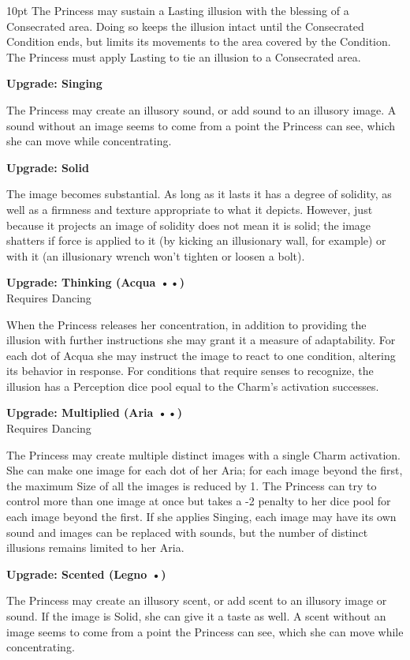 \begin{myindentpar}{10pt}
The Princess may sustain a Lasting illusion with the blessing of a Consecrated area. Doing
so keeps the illusion intact until the Consecrated Condition ends, but limits its movements
to the area covered by the Condition. The Princess must apply Lasting to tie an illusion to a
Consecrated area.

\textbf{Upgrade: Singing}

The Princess may create an illusory sound, or add sound to an illusory image. A sound
without an image seems to come from a point the Princess can see, which she can move while
concentrating.

\textbf{Upgrade: Solid}

The image becomes substantial. As long as it lasts it has a degree of solidity, as well as
a firmness and texture appropriate to what it depicts. However, just because it projects an
image of solidity does not mean it is solid; the image shatters if force is applied to it (by kicking
an illusionary wall, for example) or with it (an illusionary wrench won't tighten or loosen a
bolt).

\textbf{Upgrade: Thinking (Acqua ••)}\\
Requires Dancing

When the Princess releases her concentration, in addition to providing the illusion with
further instructions she may grant it a measure of adaptability. For each dot of Acqua she may
instruct the image to react to one condition, altering its behavior in response. For conditions
that require senses to recognize, the illusion has a Perception dice pool equal to the Charm’s
activation successes.

\textbf{Upgrade: Multiplied (Aria ••)}\\
Requires Dancing

The Princess may create multiple distinct images with a single Charm activation. She can
make one image for each dot of her Aria; for each image beyond the first, the maximum Size
of all the images is reduced by 1. The Princess can try to control more than one image at once but takes a -2 penalty to her dice pool for each image beyond the first. If she applies Singing,
each image may have its own sound and images can be replaced with sounds, but the number
of distinct illusions remains limited to her Aria.

\textbf{Upgrade: Scented (Legno •)}

The Princess may create an illusory scent, or add scent to an illusory image or sound.
If the image is Solid, she can give it a taste as well. A scent without an image seems to come
from a point the Princess can see, which she can move while concentrating.


\end{myindentpar}
